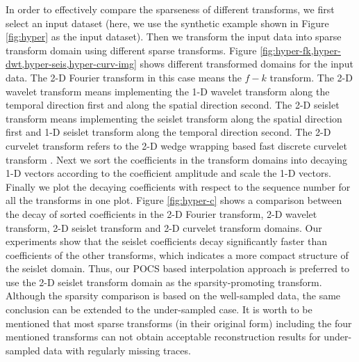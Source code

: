 In order to effectively compare the sparseness of different transforms, we first select an input dataset (here, we use the synthetic example shown in Figure \ref{fig:hyper} as the input dataset). Then we transform the input data into sparse transform domain using different sparse transforms. Figure \ref{fig:hyper-fk,hyper-dwt,hyper-seis,hyper-curv-img} shows different transformed domains for the input data. The 2-D Fourier transform in this case means the $f-k$ transform. The 2-D wavelet transform means implementing the 1-D wavelet transform along the temporal direction first and along the spatial direction second. The 2-D seislet transform means implementing the seislet transform along the spatial direction first and 1-D seislet transform along the temporal direction second. The 2-D curvelet transform refers to the 2-D wedge wrapping based fast discrete curvelet transform \cite{candes20061}. Next we sort the coefficients in the transform domains into decaying 1-D vectors according to the coefficient amplitude and scale the 1-D vectors. Finally we plot the decaying coefficients with respect to the sequence number for all the transforms in one plot. Figure \ref{fig:hyper-c} shows a comparison between the decay of sorted coefficients in the 2-D Fourier transform, 2-D wavelet transform, 2-D seislet transform and 2-D curvelet transform domains. Our experiments show that the seislet coefficients decay significantly faster than coefficients of the other transforms, which indicates a more compact structure of the seislet domain. Thus, our POCS based interpolation approach is preferred to use the 2-D seislet transform domain as the sparsity-promoting transform. Although the sparsity comparison is based on the well-sampled data, the same conclusion can be extended to the under-sampled case. It is worth to be mentioned that most sparse transforms (in their original form) including the four mentioned transforms can not obtain acceptable reconstruction results for under-sampled data with regularly missing traces.


